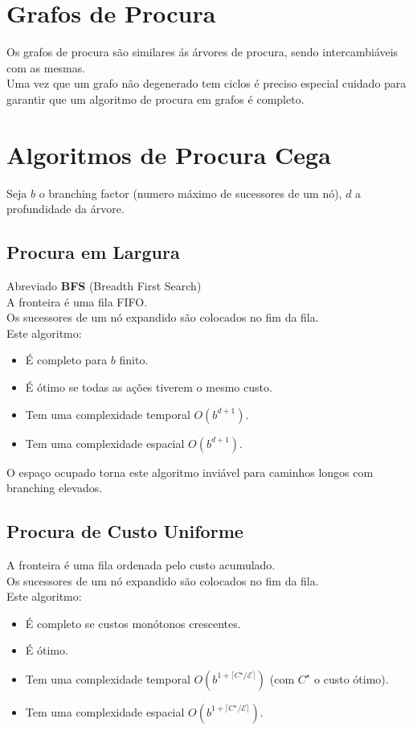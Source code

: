 \documentclass[]{report}
\begin{document}
\section{Grafos de Procura}
Os grafos de procura são similares ás árvores de procura, sendo intercambiáveis com as mesmas.\\
Uma vez que um grafo não degenerado tem ciclos é preciso especial cuidado para garantir que um algoritmo de procura em grafos é completo.
\clearpage
\section{Algoritmos de Procura Cega}
Seja $b$ o branching factor (numero máximo de sucessores de um nó), $d$ a profundidade da árvore.
\subsection{Procura em Largura}
Abreviado \textbf{BFS} (Breadth First Search)\\
A fronteira é uma fila FIFO.\\
Os sucessores de um nó expandido são colocados no fim da fila.\\
Este algoritmo:
\begin{itemize}
	\item É completo para $b$ finito.
	\item É ótimo se todas as ações tiverem o mesmo custo.
	\item Tem uma complexidade temporal $O(b^{d+1})$.
	\item Tem uma complexidade espacial $O(b^{d+1})$.
\end{itemize}
O espaço ocupado torna este algoritmo inviável para caminhos longos com branching elevados.
\subsection{Procura de Custo Uniforme}
A fronteira é uma fila ordenada pelo custo acumulado.\\
Os sucessores de um nó expandido são colocados no fim da fila.\\
Este algoritmo:
\begin{itemize}
	\item É completo se custos monótonos crescentes.
	\item É ótimo.
	\item Tem uma complexidade temporal $O(b^{1+ \lceil C^\star / \mathcal{E} \rceil})$ (com $C^\star$ o custo ótimo).
	\item Tem uma complexidade espacial $O(b^{1+ \lceil C^\star / \mathcal{E} \rceil})$.
\end{itemize}
\end{document}
